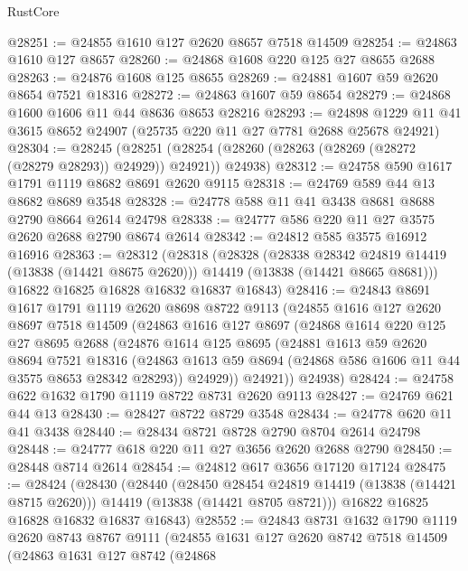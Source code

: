 \begin{lexlean}{RustCore}
\begin{coremodule}
@28251 := @24855 @1610 @127 @2620 @8657 @7518 @14509
@28254 := @24863 @1610 @127 @8657
@28260 := @24868 @1608 @220 @125 @27 @8655 @2688
@28263 := @24876 @1608 @125 @8655
@28269 := @24881 @1607 @59 @2620 @8654 @7521 @18316
@28272 := @24863 @1607 @59 @8654
@28279 := @24868 @1600 @1606 @11 @44 @8636 @8653 @28216
@28293 := @24898 @1229 @11 @41 @3615 @8652 @24907 (@25735 @220 @11 @27 @7781 @2688 @25678 @24921)
@28304 := @28245
    (@28251 (@28254 (@28260 (@28263 (@28269 (@28272 (@28279 @28293)) @24929)) @24921)) @24938)
@28312 := @24758 @590 @1617 @1791 @1119 @8682 @8691 @2620 @9115
@28318 := @24769 @589 @44 @13 @8682 @8689 @3548
@28328 := @24778 @588 @11 @41 @3438 @8681 @8688 @2790 @8664 @2614 @24798
@28338 := @24777 @586 @220 @11 @27 @3575 @2620 @2688 @2790 @8674 @2614
@28342 := @24812 @585 @3575 @16912 @16916
@28363 := @28312
    (@28318
      (@28328
        (@28338 @28342 @24819 @14419 (@13838 (@14421 @8675 @2620)))
        @14419
        (@13838 (@14421 @8665 @8681)))
      @16822
      @16825
      @16828
      @16832
      @16837
      @16843)
@28416 := @24843
    @8691
    @1617
    @1791
    @1119
    @2620
    @8698
    @8722
    @9113
    (@24855
      @1616
      @127
      @2620
      @8697
      @7518
      @14509
      (@24863
        @1616
        @127
        @8697
        (@24868
          @1614
          @220
          @125
          @27
          @8695
          @2688
          (@24876
            @1614
            @125
            @8695
            (@24881
              @1613
              @59
              @2620
              @8694
              @7521
              @18316
              (@24863 @1613 @59 @8694 (@24868 @586 @1606 @11 @44 @3575 @8653 @28342 @28293))
              @24929))
          @24921))
      @24938)
@28424 := @24758 @622 @1632 @1790 @1119 @8722 @8731 @2620 @9113
@28427 := @24769 @621 @44 @13
@28430 := @28427 @8722 @8729 @3548
@28434 := @24778 @620 @11 @41 @3438
@28440 := @28434 @8721 @8728 @2790 @8704 @2614 @24798
@28448 := @24777 @618 @220 @11 @27 @3656 @2620 @2688 @2790
@28450 := @28448 @8714 @2614
@28454 := @24812 @617 @3656 @17120 @17124
@28475 := @28424
    (@28430
      (@28440
        (@28450 @28454 @24819 @14419 (@13838 (@14421 @8715 @2620)))
        @14419
        (@13838 (@14421 @8705 @8721)))
      @16822
      @16825
      @16828
      @16832
      @16837
      @16843)
@28552 := @24843
    @8731
    @1632
    @1790
    @1119
    @2620
    @8743
    @8767
    @9111
    (@24855
      @1631
      @127
      @2620
      @8742
      @7518
      @14509
      (@24863
        @1631
        @127
        @8742
        (@24868

\end{coremodule}
\end{lexlean}
